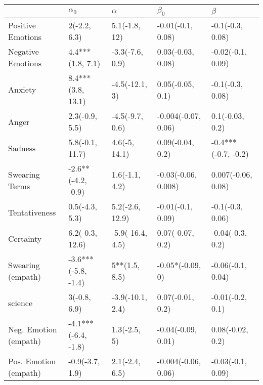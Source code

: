 \begin{tabular}{lllll}
\toprule
{} &           $\alpha_0$ &          $\alpha$ &            $\beta_0$ &              $\beta$ \\
\midrule
Positive Emotions     &         2(-2.2, 6.3) &     5.1(-1.8, 12) &    -0.01(-0.1, 0.08) &     -0.1(-0.3, 0.08) \\
Negative Emotions     &     4.4***(1.8, 7.1) &   -3.3(-7.6, 0.9) &    0.03(-0.03, 0.08) &    -0.02(-0.1, 0.09) \\
Anxiety               &    8.4***(3.8, 13.1) &    -4.5(-12.1, 3) &     0.05(-0.05, 0.1) &     -0.1(-0.3, 0.08) \\
Anger                 &       2.3(-0.9, 5.5) &   -4.5(-9.7, 0.6) &  -0.004(-0.07, 0.06) &      0.1(-0.03, 0.2) \\
Sadness               &      5.8(-0.1, 11.7) &     4.6(-5, 14.1) &     0.09(-0.04, 0.2) &  -0.4***(-0.7, -0.2) \\
Swearing Terms        &   -2.6**(-4.2, -0.9) &    1.6(-1.1, 4.2) &  -0.03(-0.06, 0.008) &   0.007(-0.06, 0.08) \\
Tentativeness         &       0.5(-4.3, 5.3) &   5.2(-2.6, 12.9) &    -0.01(-0.1, 0.09) &     -0.1(-0.3, 0.06) \\
Certainty             &      6.2(-0.3, 12.6) &  -5.9(-16.4, 4.5) &     0.07(-0.07, 0.2) &     -0.04(-0.3, 0.2) \\
Swearing (empath)     &  -3.6***(-5.8, -1.4) &     5**(1.5, 8.5) &     -0.05*(-0.09, 0) &    -0.06(-0.1, 0.04) \\
science               &         3(-0.8, 6.9) &  -3.9(-10.1, 2.4) &     0.07(-0.01, 0.2) &     -0.01(-0.2, 0.1) \\
Neg. Emotion (empath) &  -4.1***(-6.4, -1.8) &      1.3(-2.5, 5) &   -0.04(-0.09, 0.01) &     0.08(-0.02, 0.2) \\
Pos. Emotion (empath) &      -0.9(-3.7, 1.9) &    2.1(-2.4, 6.5) &  -0.004(-0.06, 0.06) &    -0.03(-0.1, 0.09) \\
\bottomrule
\end{tabular}
